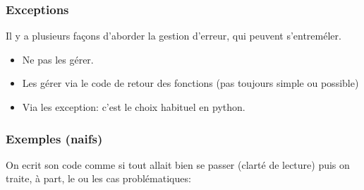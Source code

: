 \documentclass{beamer}
\begin{document}
\begin{frame}\frametitle{Exceptions}
  Il y a plusieurs façons d'aborder la gestion d'erreur, qui peuvent s'entreméler.
  \begin{itemize}
  \item Ne pas les gérer.
  \item Les gérer via le code de retour des fonctions (pas toujours simple ou possible)
  \item Via les exception: c'est le choix habituel en python.
  \end{itemize}
\end{frame}

\begin{frame}[fragile]\frametitle{Exemples (naifs)}
  On ecrit son code comme si tout allait bien se passer (clarté de lecture) puis on traite, à part, le ou les cas problématiques:

    
\end{frame}
\end{document}
